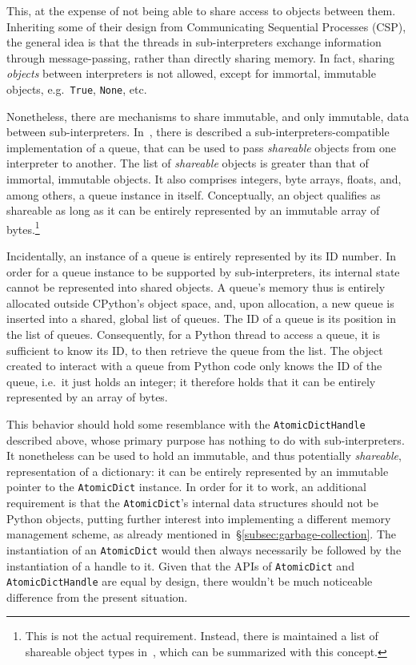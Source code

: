 This, at the expense of not being able to share access to objects between them.
Inheriting some of their design from Communicating Sequential Processes (CSP), the general idea is that the threads in sub-interpreters exchange information through message-passing, rather than directly sharing memory.
In fact, sharing \emph{objects} between interpreters is not allowed, except for immortal, immutable objects, e.g.\ \texttt{True}, \texttt{None}, etc.

Nonetheless, there are mechanisms to share immutable, and only immutable, data between sub-interpreters.
In~\cite[\S Queue Objects]{pep734}, there is described a sub-interpreters-compatible implementation of a queue, that can be used to pass \emph{shareable} objects from one interpreter to another.
The list of \emph{shareable} objects is greater than that of immortal, immutable objects.
It also comprises integers, byte arrays, floats, and, among others, a queue instance in itself.
Conceptually, an object qualifies as shareable as long as it can be entirely represented by an immutable array of bytes.\footnote{%
    This is not the actual requirement.
    Instead, there is maintained a list of shareable object types in~\cite[\S Shareable Objects]{pep734}, which can be summarized with this concept.
}

Incidentally, an instance of a queue is entirely represented by its ID number.
In order for a queue instance to be supported by sub-interpreters, its internal state cannot be represented into shared objects.
A queue's memory thus is entirely allocated outside CPython's object space, and, upon allocation, a new queue is inserted into a shared, global list of queues.
The ID of a queue is its position in the list of queues.
Consequently, for a Python thread to access a queue, it is sufficient to know its ID, to then retrieve the queue from the list.
The object created to interact with a queue from Python code only knows the ID of the queue, i.e.\ it just holds an integer; it therefore holds that it can be entirely represented by an array of bytes.

This behavior should hold some resemblance with the \texttt{AtomicDictHandle} described above, whose primary purpose has nothing to do with sub-interpreters.
It nonetheless can be used to hold an immutable, and thus potentially \emph{shareable}, representation of a dictionary: it can be entirely represented by an immutable pointer to the \texttt{AtomicDict} instance.
In order for it to work, an additional requirement is that the \texttt{AtomicDict}'s internal data structures should not be Python objects, putting further interest into implementing a different memory management scheme, as already mentioned in~\S\ref{subsec:garbage-collection}.
The instantiation of an \texttt{AtomicDict} would then always necessarily be followed by the instantiation of a handle to it.
Given that the APIs of \texttt{AtomicDict} and \texttt{AtomicDictHandle} are equal by design, there wouldn't be much noticeable difference from the present situation.

